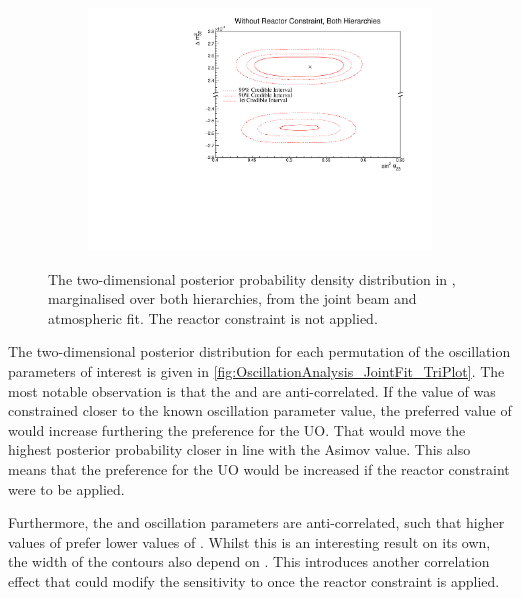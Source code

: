 \begin{figure}[h]
  \begin{subfigure}[t]{0.95\textwidth}
    \includegraphics[width=\textwidth, trim={0mm 0mm 0mm 0mm}, clip,page=1]{Figures/OA/JointFit/Contours_2D_th23_dm32_BH_0_woRC_UnSmeared_CredibleInterval.pdf}
  \end{subfigure}
  \caption{The two-dimensional posterior probability density distribution in , marginalised over both hierarchies, from the joint beam and atmospheric fit. The reactor constraint is not applied.}
  \label{fig:OscillationAnalysis_JointFit_DM32TH23}
\end{figure}


The two-dimensional posterior distribution for each permutation of the oscillation parameters of interest is given in \autoref{fig:OscillationAnalysis_JointFit_TriPlot}. The most notable observation is that the  and  are anti-correlated. If the value of  was constrained closer to the known oscillation parameter value, the preferred value of  would increase furthering the preference for the UO. That would move the highest posterior probability closer in line with the Asimov value. This also means that the preference for the UO would be increased if the reactor constraint were to be applied.

Furthermore, the  and  oscillation parameters are anti-correlated, such that higher values of  prefer lower values of . Whilst this is an interesting result on its own, the width of the  contours also depend on . This introduces another correlation effect that could modify the sensitivity to  once the reactor constraint is applied.

